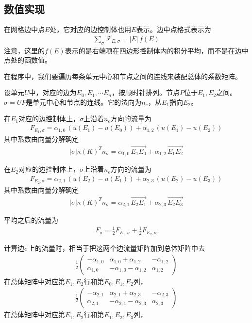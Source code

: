 \documentclass[12pt,a4paper]{article}
\theoremstyle{plain}
\begin{document}
\subsection*{数值实现}

在网格边中点$E$处，它对应的边控制体也用$E$表示。边中点格式表示为
\begin{align*}
\sum_{\sigma} \mathcal{F}_{E, \sigma} = |E| \, f(E)
\end{align*}
注意，这里的$f(E)$表示的是右端项在四边形控制体内的积分平均，而不是在边中点处的函数值。

在程序中，我们要遍历每条单元中心和节点之间的连线来装配总体的系数矩阵。

设单元$U$中，对应的边为$E_0, E_1, \cdots E_n$，按顺时针排列。节点$P$位于$E_1, E_2$之间。$\sigma = U P$是单元中心和节点的连线。它的法向为$n_e$，从$E_1$指向$E_2$。

在$E_1$对应的边控制体上，$\sigma$上沿着$n_e$方向的流量为
\begin{align*}
F_{E_1, \sigma} = \alpha_{1,0} \, (u(E_1) - u(E_0)) + \alpha_{1,2} \, (u(E_1) - u(E_2))
\end{align*}
其中系数由向量分解确定
\begin{align*}
|\sigma| \kappa(K)^T n_{\sigma} = \alpha_{1,0} \, \overrightarrow{E_1 E_0} + \alpha_{1,2} \, \overrightarrow{E_1 E_2}
\end{align*}

在$E_2$对应的边控制体上，$\sigma$上沿着$n_e$方向的流量为
\begin{align*}
F_{E_2, \sigma} = \alpha_{2,1} \, (u(E_2) - u(E_1)) + \alpha_{2,3} \, (u(E_2) - u(E_3))
\end{align*}
其中系数由向量分解确定
\begin{align*}
|\sigma| \kappa(K)^T n_{\sigma} = \alpha_{2,1} \, \overrightarrow{E_2 E_1} + \alpha_{2,3} \, \overrightarrow{E_2 E_3}
\end{align*}

平均之后的流量为
\begin{align*}
F_{\sigma} = \frac12 F_{E_1, \sigma} + \frac12 F_{E_2, \sigma}
\end{align*}

计算边$\sigma$上的流量时，相当于把这两个边流量矩阵加到总体矩阵中去
\begin{align*}
\frac12
\left(
\begin{matrix}
-\alpha_{1,0} & \alpha_{1,0} + \alpha_{1,2} & - \alpha_{1,2} \\
\alpha_{1,0} & -\alpha_{1,0} - \alpha_{1,2} & \alpha_{1,2} 
\end{matrix}
\right)
\end{align*}
在总体矩阵中对应第$E_1, E_2$行和第$E_0, E_1, E_2$列，
\begin{align*}
\frac12
\left(
\begin{matrix}
-\alpha_{2,1} & \alpha_{2,1} + \alpha_{2,3} & - \alpha_{2,3} \\
\alpha_{2,1} & -\alpha_{2,1} - \alpha_{2,3} & \alpha_{2,3} 
\end{matrix}
\right)
\end{align*}
在总体矩阵中对应第$E_1, E_2$行和第$E_1, E_2, E_3$列，
\end{document}
